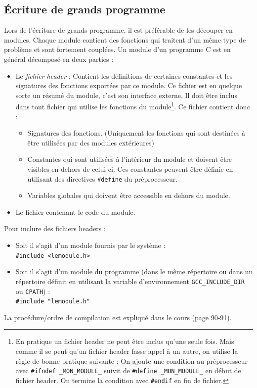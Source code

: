 \subsection{Écriture de grands programme}
Lors de l'écriture de grands programme, il est préférable de les découper en modules.
Chaque module contient des fonctions qui traitent d'un même type de problème et sont fortement couplées.
Un module d'un programme C est en général décomposé en deux parties :
\begin{itemize}
  \item Le \textit{fichier header} : Contient les définitions de certaines constantes et les signatures des fonctions exportées par ce module.
    Ce fichier est en quelque sorte un résumé du module, c'est son interface externe.
    Il doit être inclus dans tout fichier qui utilise les fonctions du module\footnote{En pratique un fichier header ne peut être inclus qu'une seule fois.
      Mais comme il se peut qu'un fichier header fasse appel à un autre, on utilise la règle de bonne pratique suivante : On ajoute une condition au préprocesseur avec \texttt{\#ifndef \_MON\_MODULE\_} suivit de \texttt{\#define \_MON\_MODULE\_} en début de fichier header.
    On termine la condition avec \texttt{\#endif} en fin de fichier.}.
    Ce fichier contient donc :
    \begin{itemize}
      \item Signatures des fonctions.
        (Uniquement les fonctions qui sont destinées à être utilisées par des modules extérieures)
      \item Constantes qui sont utilisées à l'intérieur du module et doivent être visibles en dehors de celui-ci.
        Ces constantes peuvent être définie en utilisant des directives \texttt{\#define} du préprocesseur.
      \item Variables globales qui doivent être accessible en dehors du module.
    \end{itemize}
  \item Le fichier contenant le code du module.
\end{itemize}

Pour inclure des fichiers headers :
\begin{itemize}
  \item Soit il s'agit d'un module fournis par le système : \\
    \texttt{\#include <lemodule.h>}
  \item Soit il s'agit d'un module du programme (dans le même répertoire ou dans un répertoire définit en utilisant la variable d'environnement \texttt{GCC\_INCLUDE\_DIR} ou \texttt{CPATH}) : \\
    \texttt{\#include "lemodule.h"}
\end{itemize}
La procédure/ordre de compilation est expliqué dans le cours (page 90-91).


